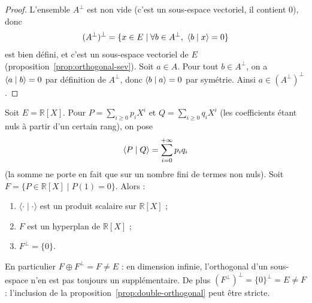 \begin{proof}
L'ensemble $A^\perp$ est non vide (c'est un sous-espace vectoriel, il contient $0$), donc
\[(A^\perp)^\perp=\{x\in E\mid\forall b\in A^\perp,\ \langle b\mid x\rangle=0\}\]
est bien défini, et c'est un sous-espace vectoriel de $E$ (proposition~\ref{prop:orthogonal-sev}). Soit $a\in A$. Pour tout $b\in A^\perp$, on a $\langle a\mid b\rangle=0$ par définition de $A^\perp$, donc $\langle b\mid a\rangle=0$ par symétrie. Ainsi $a\in(A^\perp)^\perp$.
\end{proof}

\begin{exemple}
\label{ex:hyperplan-orthogonal-nul}
Soit $E=\mathbb{R}[X]$. Pour $P=\sum_{i\geq 0}p_iX^i$ et $Q=\sum_{i\geq 0}q_iX^i$ (les coefficients étant nuls à partir d'un certain rang), on pose
\[\langle P\mid Q\rangle=\sum_{i=0}^{+\infty}p_iq_i\]
(la somme ne porte en fait que sur un nombre fini de termes non nuls). Soit $F=\{P\in\mathbb{R}[X]\mid P(1)=0\}$. Alors :
\begin{enumerate}
\item $\langle\cdot\mid\cdot\rangle$ est un produit scalaire sur $\mathbb{R}[X]$ ;
\item $F$ est un hyperplan de $\mathbb{R}[X]$ ;
\item $F^\perp=\{0\}$.
\end{enumerate}
En particulier $F\oplus F^\perp=F\neq E$ : en dimension infinie, l'orthogonal d'un sous-espace n'en est pas toujours un supplémentaire. De plus $(F^\perp)^\perp=\{0\}^\perp=E\neq F$ : l'inclusion de la proposition~\ref{prop:double-orthogonal} peut être stricte.
\end{exemple}


